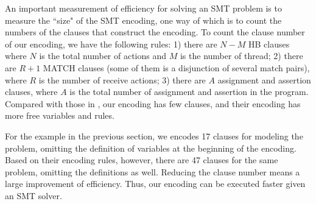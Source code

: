 An important measurement of efficiency for solving an SMT problem is to measure the ``size" of the SMT encoding, one way of which is to count the numbers of the clauses that construct the encoding. To count the clause number of our encoding, we have the following rules: 1) there are $N-M$ HB clauses where $N$ is the total number of actions and $M$ is the number of thread; 2) there are $R+1$ MATCH clauses (some of them is a disjunction of several match pairs), where $R$ is the number of receive actions; 3) there are $A$ assignment and assertion clauses, where $A$ is the total number of assignment and assertion in the program. Compared with those in \cite{elwakil:padtad10}, our encoding has few clauses, and their encoding has more free variables and rules.

For the example in the previous section, we encodes 17 clauses for modeling the problem, omitting the definition of variables at the beginning of the encoding. Based on their encoding rules, however, there are 47 clauses for the same problem, omitting the definitions as well. Reducing the clause number means a large improvement of efficiency. Thus, our encoding can be executed faster given an SMT solver.
